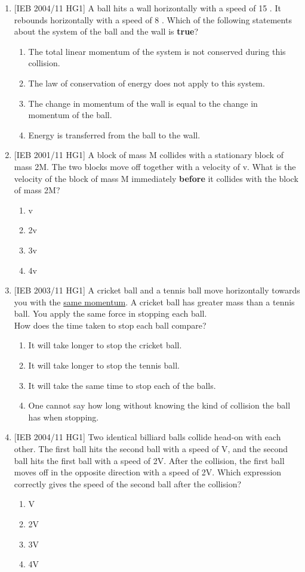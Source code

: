 \begin{eocexercises}{}
\begin{enumerate}
\item{[IEB 2004/11 HG1] A ball hits a wall horizontally with a speed of 15 \ms. It rebounds horizontally with a speed of 8 \ms. Which of the following statements about the system of the ball and the wall is \textbf{true}?
\begin{enumerate}
\item {The total linear momentum of the system is not conserved during this collision.}
\item {The law of conservation of energy does not apply to this system.}
\item {The change in momentum of the wall is equal to the change in momentum of the ball.}
\item {Energy is transferred from the ball to the wall.}
\end{enumerate}}

\item{[IEB 2001/11 HG1] A block of mass M collides with a stationary block of mass 2M. The two blocks move off together with a velocity of v. What is the velocity of the block of mass M immediately \textbf{before} it collides with the block of mass 2M?
\begin{enumerate}
\item {v}
\item {2v}
\item {3v}
\item {4v}
\end{enumerate}}

\item{[IEB 2003/11 HG1] A cricket ball and a tennis ball move horizontally towards you with the \underline{same momentum}. A cricket ball has greater mass than a tennis ball. You apply the same force in stopping each ball.\\
How does the time taken to stop each ball compare?
\begin{enumerate}
\item {It will take longer to stop the cricket ball.}
\item {It will take longer to stop the tennis ball.}
\item {It will take the same time to stop each of the balls.}
\item {One cannot say how long without knowing the kind of collision the ball has when stopping.}
\end{enumerate}}

\item{[IEB 2004/11 HG1] Two identical billiard balls collide head-on with each other. The first ball hits the second ball with a speed of V, and the second ball hits the first ball with a speed of 2V. After the collision, the first ball moves off in the opposite direction with a speed of 2V. Which expression correctly gives the speed of the second ball after the collision?
\begin{enumerate}
\item {V}
\item {2V}
\item {3V}
\item {4V}
\end{enumerate}}


\end{enumerate}
\end{eocexercises}
